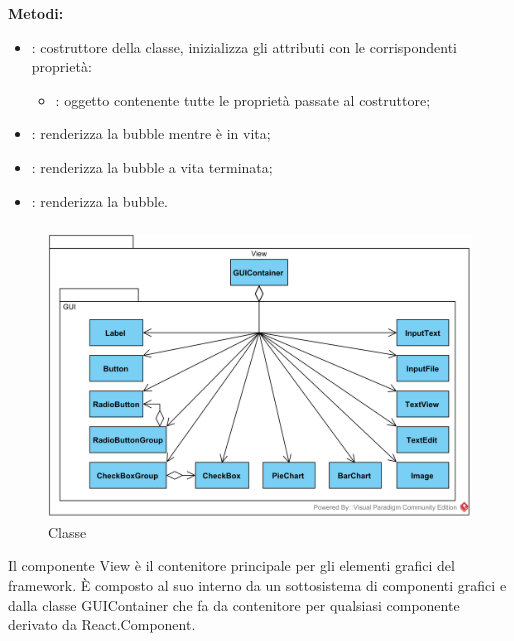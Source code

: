 \textbf{Metodi:}
\begin{itemize}
	\item {}: costruttore della classe, inizializza gli attributi con le corrispondenti proprietà:
	\begin{itemize}
		\item {}: oggetto contenente tutte le proprietà passate al costruttore;
	\end{itemize}
	\item {}: renderizza la bubble mentre è in vita;
	\item {}: renderizza la bubble a vita terminata;
	\item {}: renderizza la bubble.
\end{itemize}

\subsubsection[::View]{\class}\label{\class}
\begin{figure}[H]
	\centering
	\includegraphics[width=15cm]{./diagrammi/framework/view.png}
	\caption{Classe \class}
\end{figure}
Il componente View è il contenitore principale per gli elementi grafici del framework. È composto al suo interno da un sottosistema di componenti grafici e dalla classe GUIContainer che fa da contenitore per qualsiasi componente derivato da React.Component.

